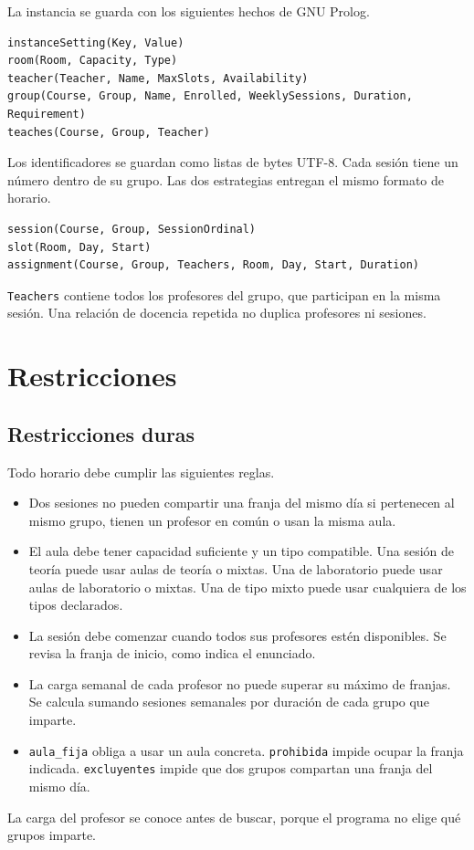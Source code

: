 \documentclass[11pt]{article}
\begin{document}
La instancia se guarda con los siguientes hechos de GNU Prolog.
\begin{lstlisting}
instanceSetting(Key, Value)
room(Room, Capacity, Type)
teacher(Teacher, Name, MaxSlots, Availability)
group(Course, Group, Name, Enrolled, WeeklySessions, Duration, Requirement)
teaches(Course, Group, Teacher)
\end{lstlisting}
Los identificadores se guardan como listas de bytes UTF-8. Cada sesión tiene un número dentro de su grupo. Las dos estrategias entregan el mismo formato de horario.
\begin{lstlisting}
session(Course, Group, SessionOrdinal)
slot(Room, Day, Start)
assignment(Course, Group, Teachers, Room, Day, Start, Duration)
\end{lstlisting}
\texttt{Teachers} contiene todos los profesores del grupo, que participan en la misma sesión. Una relación de docencia repetida no duplica profesores ni sesiones.

\section{Restricciones}

\subsection{Restricciones duras}

Todo horario debe cumplir las siguientes reglas.
\begin{itemize}
    \item Dos sesiones no pueden compartir una franja del mismo día si pertenecen al mismo grupo, tienen un profesor en común o usan la misma aula.
    \item El aula debe tener capacidad suficiente y un tipo compatible. Una sesión de teoría puede usar aulas de teoría o mixtas. Una de laboratorio puede usar aulas de laboratorio o mixtas. Una de tipo mixto puede usar cualquiera de los tipos declarados.
    \item La sesión debe comenzar cuando todos sus profesores estén disponibles. Se revisa la franja de inicio, como indica el enunciado.
    \item La carga semanal de cada profesor no puede superar su máximo de franjas. Se calcula sumando sesiones semanales por duración de cada grupo que imparte.
    \item \texttt{aula\_fija} obliga a usar un aula concreta. \texttt{prohibida} impide ocupar la franja indicada. \texttt{excluyentes} impide que dos grupos compartan una franja del mismo día.
\end{itemize}
La carga del profesor se conoce antes de buscar, porque el programa no elige qué grupos imparte.
\end{document}

